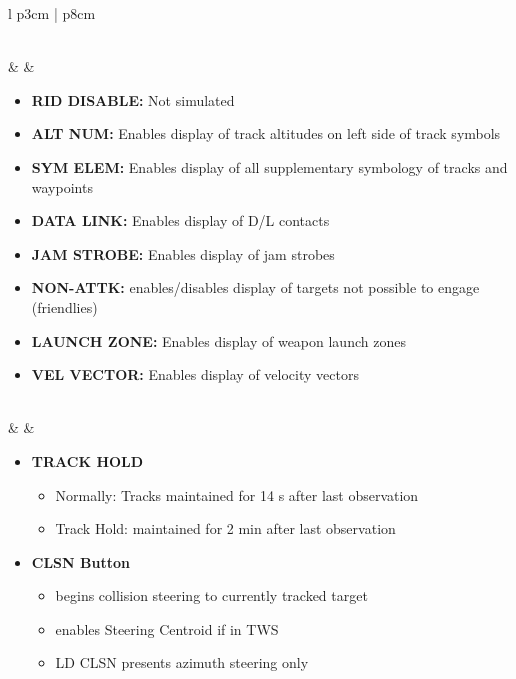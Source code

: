 \documentclass[8pt,usenames,dvipsnames,twoside]{article}
\begin{document}
\begin{center}
\begin{longtable}{l p{3cm} | p{8cm}}
\begin{minipage}[t]{\linewidth}
\begin{itemize}
					\end{itemize}
				\end{minipage} \\
				\midrule
				\textbullet &  & 
				\begin{minipage}[t]{\linewidth}
					\vspace{-7pt}
					\begin{itemize}
						\item \textbf{RID DISABLE:} Not simulated
						\item \textbf{ALT NUM:} Enables display of track altitudes on left side of track symbols
						\item \textbf{SYM ELEM:} Enables display of all supplementary symbology of tracks and waypoints
						\item \textbf{DATA LINK:} Enables display of D/L contacts
						\item \textbf{JAM STROBE:} Enables display of jam strobes
						\item \textbf{NON-ATTK:} enables/disables display of targets not possible to engage (friendlies)
						\item \textbf{LAUNCH ZONE:} Enables display of weapon launch zones
						\item \textbf{VEL VECTOR:} Enables display of velocity vectors
					\end{itemize}
				\end{minipage} \\
				\midrule
				\textbullet &  & 
				\begin{minipage}[t]{\linewidth}
					\vspace{-7pt}
					\begin{itemize}
						\item \textbf{TRACK HOLD} 
						\begin{itemize}
							\item Normally: Tracks maintained for 14 s after last observation
							\item Track Hold: maintained for 2 min after last observation
						\end{itemize}
						\item \textbf{CLSN Button} 
						\begin{itemize}
							\item begins collision steering to currently tracked target
							\item enables Steering Centroid if in TWS
							\item LD CLSN presents azimuth steering only

\end{itemize}
\end{itemize}
\end{minipage}
\end{longtable}
\end{center}
\end{document}
